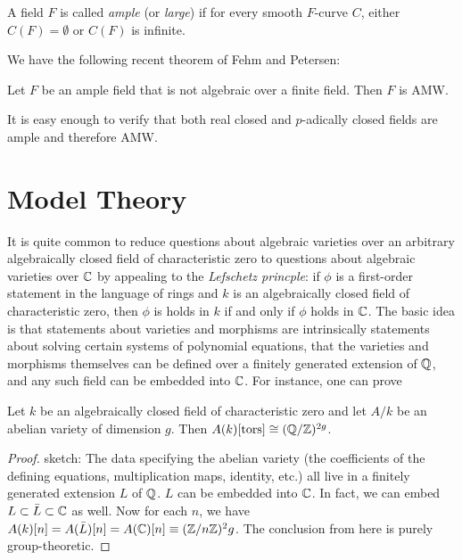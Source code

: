 \begin{definition}
A field $F$ is called \emph{ample} (or \emph{large}) if for every smooth $F$-curve $C$, either $C(F)=\emptyset$ or $C(F)$ is infinite.
\end{definition}

We have the following recent theorem of Fehm and Petersen:

\begin{theorem}
\label{fehm-petersen}
Let $F$ be an ample field that is not algebraic over a finite field. Then $F$ is AMW.
\end{theorem}

It is easy enough to verify that both real closed and $p$-adically closed fields are ample and therefore AMW.

\section{Model Theory}
It is quite common to reduce questions about algebraic varieties over an arbitrary algebraically closed field of characteristic zero to questions about algebraic varieties over $\mathbb{C}$ by appealing to the \emph{Lefschetz princple}: if $\phi$ is a first-order statement in the language of rings and $k$ is an algebraically closed field of characteristic zero, then $\phi$ is holds in $k$ if and only if $\phi$ holds in $\mathbb{C}$. The basic idea is that statements about varieties and morphisms are intrinsically statements about solving certain systems of polynomial equations, that the varieties and morphisms themselves can be defined over a finitely generated extension of $\mathbb{Q}$, and any such field can be embedded into $\mathbb{C}$. For instance, one can prove 

\begin{proposition}
Let $k$ be an algebraically closed field of characteristic zero and let $A/k$ be an abelian variety of dimension $g$. Then $A(k)[\operatorname{tors}]\cong (\mathbb{Q}/\mathbb{Z})^{2g}$.
\end{proposition}
\begin{proof}
sketch: The data specifying the abelian variety (the coefficients of the defining equations, multiplication maps, identity, etc.) all live in a finitely generated extension $L$ of $\mathbb{Q}$. $L$ can be embedded into $\mathbb{C}$. In fact, we can embed $L\subset\bar{L}\subset \mathbb{C}$ as well. Now for each $n$, we have $A(k)[n]=A(\bar{L})[n]=A(\mathbb{C})[n]\equiv (\mathbb{Z}/n\mathbb{Z})^2g$. The conclusion from here is purely group-theoretic.
\end{proof}


